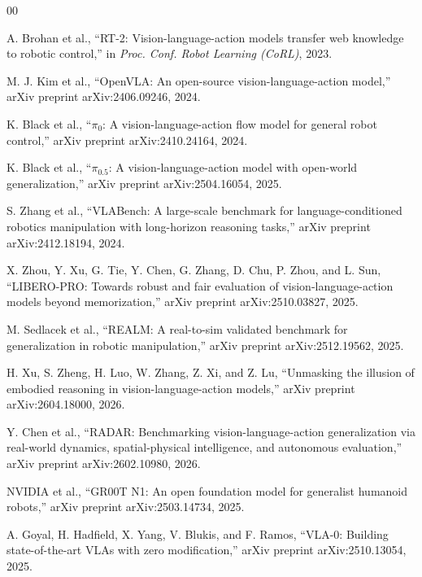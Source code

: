 \begin{thebibliography}{00}


A. Brohan et al.,
``RT-2: Vision-language-action models transfer web knowledge to robotic control,''
in \emph{Proc. Conf. Robot Learning (CoRL)}, 2023.

M. J. Kim et al.,
``OpenVLA: An open-source vision-language-action model,''
arXiv preprint arXiv:2406.09246, 2024.

K. Black et al.,
``$\pi_0$: A vision-language-action flow model for general robot control,''
arXiv preprint arXiv:2410.24164, 2024.

K. Black et al.,
``$\pi_{0.5}$: A vision-language-action model with open-world generalization,''
arXiv preprint arXiv:2504.16054, 2025.


S. Zhang et al.,
``VLABench: A large-scale benchmark for language-conditioned robotics
manipulation with long-horizon reasoning tasks,''
arXiv preprint arXiv:2412.18194, 2024.

X. Zhou, Y. Xu, G. Tie, Y. Chen, G. Zhang, D. Chu, P. Zhou, and L. Sun,
``LIBERO-PRO: Towards robust and fair evaluation of
vision-language-action models beyond memorization,''
arXiv preprint arXiv:2510.03827, 2025.

M. Sedlacek et al.,
``REALM: A real-to-sim validated benchmark for generalization in robotic
manipulation,''
arXiv preprint arXiv:2512.19562, 2025.

H. Xu, S. Zheng, H. Luo, W. Zhang, Z. Xi, and Z. Lu,
``Unmasking the illusion of embodied reasoning in
vision-language-action models,''
arXiv preprint arXiv:2604.18000, 2026.

Y. Chen et al.,
``RADAR: Benchmarking vision-language-action generalization via
real-world dynamics, spatial-physical intelligence, and autonomous
evaluation,''
arXiv preprint arXiv:2602.10980, 2026.


NVIDIA et al.,
``GR00T N1: An open foundation model for generalist humanoid robots,''
arXiv preprint arXiv:2503.14734, 2025.

A. Goyal, H. Hadfield, X. Yang, V. Blukis, and F. Ramos,
``VLA-0: Building state-of-the-art VLAs with zero modification,''
arXiv preprint arXiv:2510.13054, 2025.


\end{thebibliography}
